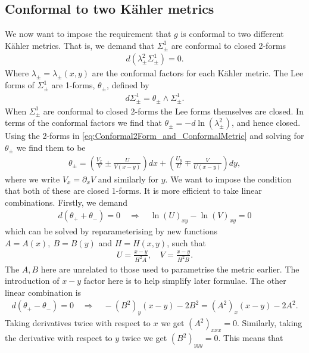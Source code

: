 \documentclass[10pt]{report}
\theoremstyle{definition}
\begin{document}
\subsection{Conformal to two K\"ahler metrics}

We now want to impose the requirement that $g$ is conformal to two different K\"ahler metrics. That is, we demand that $\Sigma^1_\pm$ are conformal to closed 2-forms 
\begin{align}
    d( \lambda^2_\pm \Sigma^1_\pm) = 0.
\end{align}
Where $\lambda_\pm = \lambda_\pm(x,y)$ are the conformal factors for each K\"ahler metric.
The Lee forms of $\Sigma^1_\pm$ are 1-forms, $\theta_\pm$, defined by 
\begin{align}
    d\Sigma^1_\pm = \theta_\pm \wedge \Sigma^1_\pm.
\end{align}
When $\Sigma^1_\pm$ are conformal to closed 2-forms the Lee forms themselves are closed.
In terms of the conformal factors we find that $\theta_\pm = - d\ln(\lambda^2_\pm)$, and hence closed.
Using the 2-forms in \cref{eq:Conformal2Form_and_ConformalMetric} and solving for $\theta_\pm$ we find them to be
\begin{align}
    \theta_\pm = \left( \frac{V_x}{V} \pm \frac{U}{V(x-y)} \right) dx + \left( \frac{U_y}{U} \mp \frac{V}{U(x-y)} \right)dy,
\end{align}
where we write $V_x = \partial_x V$ and similarly for $y$. We want to impose the condition that both of these are closed 1-forms. 
It is more efficient to take linear combinations. Firstly, we demand 
\begin{align}
    d(\theta_+ + \theta_-) = 0 \quad \Rightarrow \quad \ln(U)_{xy} - \ln(V)_{xy} = 0
\end{align}
which can be solved by reparameterising by new functions $A = A(x),\ B = B(y)$ and $H = H(x,y)$, such that
\begin{align}
    U = \frac{x-y}{H^2A}, \quad V = \frac{x-y}{H^2B}.
\end{align}
The $A,B$ here are unrelated to those used to parametrise the metric earlier. The introduction of $x-y$ factor here is to help simplify later formulae.
The other linear combination is 
\begin{align}
    d(\theta_+ - \theta_-) = 0 \quad \Rightarrow \quad -(B^2)_y (x-y) - 2B^2 = (A^2)_x (x-y) - 2A^2. \label{eq:AB_Quadratic_Equation}
\end{align}
Taking derivatives twice with respect to $x$ we get $(A^2)_{xxx} = 0$. Similarly, taking the derivative with respect to $y$ twice we get  $(B^2)_{yyy}=0$. This means that 
\end{document}
